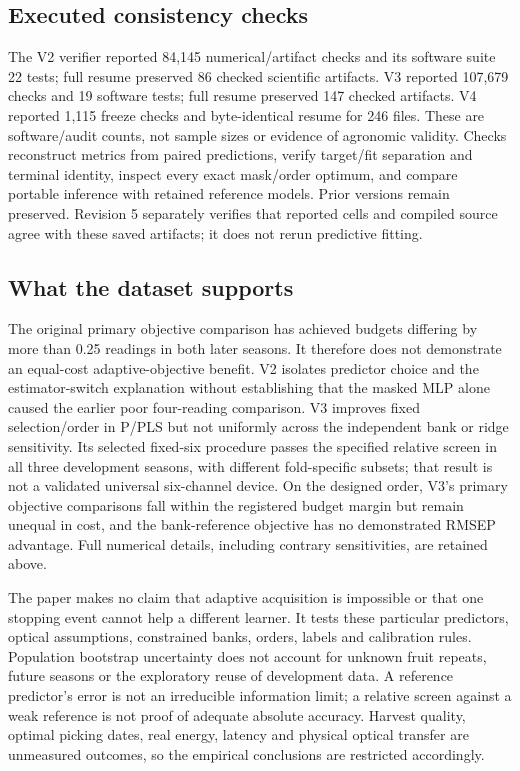 \documentclass[10pt,a4paper]{article}
\begin{document}
\subsection{Executed consistency checks}
The V2 verifier reported 84,145 numerical/artifact checks and its software suite 22 tests; full resume preserved 86 checked scientific artifacts. V3 reported 107,679 checks and 19 software tests; full resume preserved 147 checked artifacts. V4 reported 1,115 freeze checks and byte-identical resume for 246 files. These are software/audit counts, not sample sizes or evidence of agronomic validity. Checks reconstruct metrics from paired predictions, verify target/fit separation and terminal identity, inspect every exact mask/order optimum, and compare portable inference with retained reference models. Prior versions remain preserved. Revision 5 separately verifies that reported cells and compiled source agree with these saved artifacts; it does not rerun predictive fitting.

\subsection{What the dataset supports}
The original primary objective comparison has achieved budgets differing by more than 0.25 readings in both later seasons. It therefore does not demonstrate an equal-cost adaptive-objective benefit. V2 isolates predictor choice and the estimator-switch explanation without establishing that the masked MLP alone caused the earlier poor four-reading comparison. V3 improves fixed selection/order in P/PLS but not uniformly across the independent bank or ridge sensitivity. Its selected fixed-six procedure passes the specified relative screen in all three development seasons, with different fold-specific subsets; that result is not a validated universal six-channel device. On the designed order, V3's primary objective comparisons fall within the registered budget margin but remain unequal in cost, and the bank-reference objective has no demonstrated RMSEP advantage. Full numerical details, including contrary sensitivities, are retained above.

The paper makes no claim that adaptive acquisition is impossible or that one stopping event cannot help a different learner. It tests these particular predictors, optical assumptions, constrained banks, orders, labels and calibration rules. Population bootstrap uncertainty does not account for unknown fruit repeats, future seasons or the exploratory reuse of development data. A reference predictor's error is not an irreducible information limit; a relative screen against a weak reference is not proof of adequate absolute accuracy. Harvest quality, optimal picking dates, real energy, latency and physical optical transfer are unmeasured outcomes, so the empirical conclusions are restricted accordingly.
\end{document}
